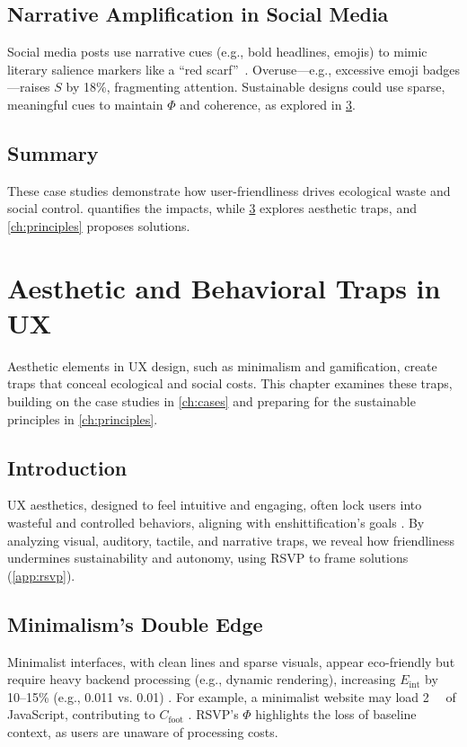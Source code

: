 \documentclass[openany]{book}
\newcommand{\PhiS}{\Phi} %
\newcommand{\Sent}{S} %
\newcommand{\Eint}{E_{\mathrm{int}}} %
\newcommand{\Cfoot}{C_{\mathrm{foot}}} %
\newcommand{\kWh}{\mathrm{kWh}}
\begin{document}
\section{Narrative Amplification in Social Media}
\label{sec:cases-narrative}
Social media posts use narrative cues (e.g., bold headlines, emojis) to mimic literary salience markers like a \textquotedblleft red scarf\textquotedblright\ \citep{lewis1942}. Overuse---e.g., excessive emoji badges---raises $\Sent$ by 18\%, fragmenting attention. Sustainable designs could use sparse, meaningful cues to maintain $\PhiS$ and coherence, as explored in \cref{ch:aesthetic}.

\section{Summary}
These case studies demonstrate how user-friendliness drives ecological waste and social control.  quantifies the impacts, while \cref{ch:aesthetic} explores aesthetic traps, and \cref{ch:principles} proposes solutions.

\chapter{Aesthetic and Behavioral Traps in UX}
\label{ch:aesthetic}

Aesthetic elements in UX design, such as minimalism and gamification, create traps that conceal ecological and social costs. This chapter examines these traps, building on the case studies in \cref{ch:cases} and preparing for the sustainable principles in \cref{ch:principles}.

\section{Introduction}
\label{sec:aesthetic-intro}
UX aesthetics, designed to feel intuitive and engaging, often lock users into wasteful and controlled behaviors, aligning with enshittification’s goals \citep{doctorow2022}. By analyzing visual, auditory, tactile, and narrative traps, we reveal how friendliness undermines sustainability and autonomy, using RSVP to frame solutions (\cref{app:rsvp}).

\section{Minimalism’s Double Edge}
\label{sec:aesthetic-minimalism}
Minimalist interfaces, with clean lines and sparse visuals, appear eco-friendly but require heavy backend processing (e.g., dynamic rendering), increasing $\Eint$ by 10--15\% (e.g., \SI{0.011}{\kWh} vs. \SI{0.01}{\kWh}) \citep{designlab2024}. For example, a minimalist website may load \SI{2}{\mega\byte} of JavaScript, contributing to $\Cfoot$ \citep{extentia2024}. RSVP’s $\PhiS$ highlights the loss of baseline context, as users are unaware of processing costs.
\end{document}
